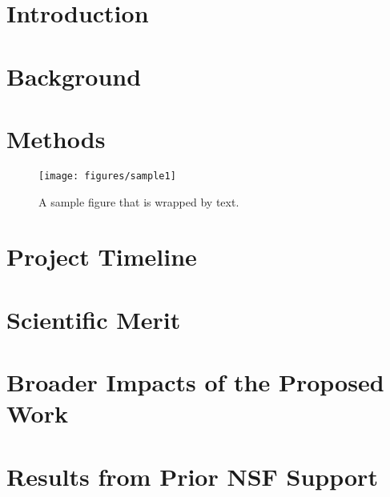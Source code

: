\section{Introduction}
\label{sec:intro}

\lipsum{}

\section{Background}
\label{sec:bg}

\lipsum{}

\section{Methods}
\label{sec:methods}

\lipsum{}

\setlength\intextsep{0pt}
\begin{wrapfigure}[20]{R}{2.4in}
 \vspace{-15pt}
 \centering
 \texttt{[image: figures/sample1]}
 \caption{A sample figure that is wrapped by text.}
 \label{fig:sample}
\end{wrapfigure}

\section{Project Timeline}
\label{sec:timeline}

\lipsum{}

\section{Scientific Merit}
\label{sec:merit}

\lipsum{}

\section{Broader Impacts of the Proposed Work}
\label{sec:broader}

\lipsum{}

\section{Results from Prior NSF Support}
\label{sec:prior}

\lipsum{}
